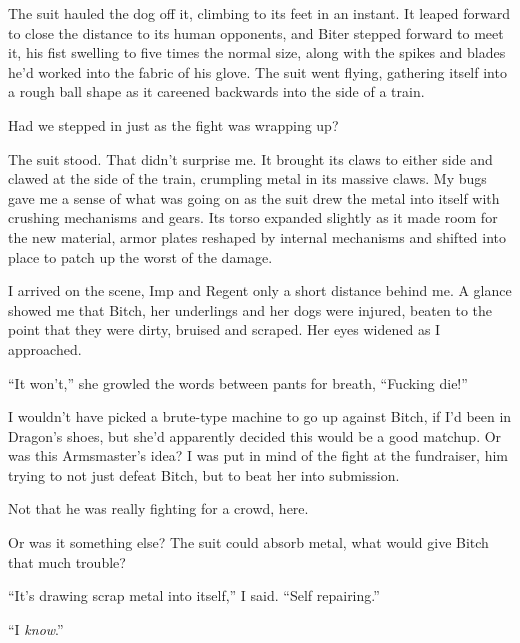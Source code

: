 The suit hauled the dog off it, climbing to its feet in an instant.  It leaped forward to close the distance to its human opponents, and Biter stepped forward to meet it, his fist swelling to five times the normal size, along with the spikes and blades he'd worked into the fabric of his glove.  The suit went flying, gathering itself into a rough ball shape as it careened backwards into the side of a train.



Had we stepped in just as the fight was wrapping up?



The suit stood.  That didn't surprise me.  It brought its claws to either side and clawed at the side of the train, crumpling metal in its massive claws.  My bugs gave me a sense of what was going on as the suit drew the metal into itself with crushing mechanisms and gears.  Its torso expanded slightly as it made room for the new material, armor plates reshaped by internal mechanisms and shifted into place to patch up the worst of the damage.



I arrived on the scene, Imp and Regent only a short distance behind me.  A glance showed me that Bitch, her underlings and her dogs were injured, beaten to the point that they were dirty, bruised and scraped.  Her eyes widened as I approached.



``It won't,'' she growled the words between pants for breath, ``Fucking die!''



I wouldn't have picked a brute-type machine to go up against Bitch, if I'd been in Dragon's shoes, but she'd apparently decided this would be a good matchup.  Or was this Armsmaster's idea?  I was put in mind of the fight at the fundraiser, him trying to not just defeat Bitch, but to beat her into submission.



Not that he was really fighting for a crowd, here.



Or was it something else?  The suit could absorb metal, what would give Bitch that much trouble?



``It's drawing scrap metal into itself,'' I said.  ``Self repairing.''



``I \emph{know}.''



